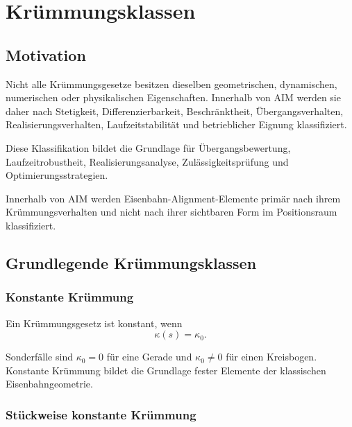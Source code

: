
\chapter{Krümmungsklassen}
\label{chap:curvature-classes}

\section*{Motivation}

Nicht alle Krümmungsgesetze besitzen dieselben geometrischen, dynamischen,
numerischen oder physikalischen Eigenschaften. Innerhalb von AIM werden sie
daher nach Stetigkeit, Differenzierbarkeit, Beschränktheit,
Übergangsverhalten, Realisierungsverhalten, Laufzeitstabilität und
betrieblicher Eignung klassifiziert.

Diese Klassifikation bildet die Grundlage für Übergangsbewertung,
Laufzeitrobustheit, Realisierungsanalyse, Zulässigkeitsprüfung und
Optimierungsstrategien.

\begin{principle}[Krümmungsklassifikationsprinzip]
\label{princ:curvature-classification}
Innerhalb von AIM werden Eisenbahn-Alignment-Elemente primär nach ihrem
Krümmungsverhalten und nicht nach ihrer sichtbaren Form im Positionsraum
klassifiziert.
\end{principle}

\section{Grundlegende Krümmungsklassen}

\subsection{Konstante Krümmung}

\begin{definition}
\label{def:constant-curvature-class}
Ein Krümmungsgesetz ist konstant, wenn
\[
\kappa(s)=\kappa_0.
\]
\end{definition}

Sonderfälle sind \(\kappa_0=0\) für eine Gerade und \(\kappa_0\neq 0\) für
einen Kreisbogen. Konstante Krümmung bildet die Grundlage fester Elemente der
klassischen Eisenbahngeometrie.

\subsection{Stückweise konstante Krümmung}

